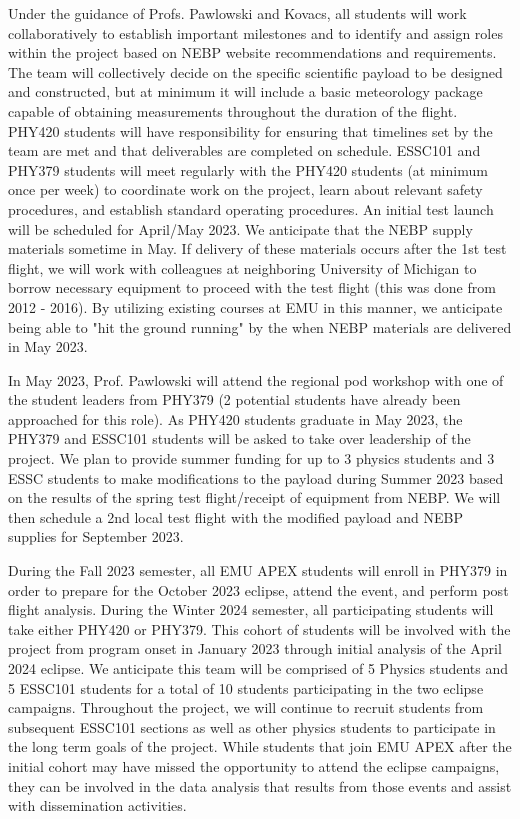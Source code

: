 \documentclass[12pt]{article}
\begin{document}
Under the guidance of Profs. Pawlowski and Kovacs, all students will work collaboratively to establish important milestones and to identify
and assign roles within the project based on NEBP website recommendations and requirements.
The team will collectively decide on the specific scientific payload to be designed and constructed,
but at minimum it will include a basic meteorology package capable of obtaining
measurements throughout the duration of the flight.
PHY420 students will have responsibility for ensuring that
timelines set by the team are met and that deliverables are completed on schedule.
ESSC101 and PHY379 students will
meet regularly with the PHY420 students (at minimum once per week) to coordinate work on the
project, learn about relevant safety procedures, and establish standard operating procedures.
An initial test launch will be scheduled for April/May 2023.
We anticipate that the NEBP supply materials sometime in May. If
delivery of these materials occurs after the 1st test flight, we will work with
colleagues at neighboring University of Michigan to borrow necessary equipment
to proceed with the test flight (this was done from 2012 - 2016). By utilizing existing courses
at EMU in this manner, we anticipate being able to "hit the ground running" by the
when NEBP materials are delivered in May 2023.

In May 2023, Prof. Pawlowski will attend the regional pod workshop with one of
the student leaders from PHY379 (2 potential students have already been approached
for this role).
As PHY420 students graduate in May 2023, the PHY379 and ESSC101 students will be
asked to take over leadership of the project. We plan to provide
summer funding for up to 3 physics students and 3 ESSC students to make modifications to the
payload during Summer 2023 based on the results of the spring test flight/receipt
of equipment from NEBP.
We will then schedule a 2nd local test flight with the modified payload and
NEBP supplies for September
2023.

 During the Fall 2023 semester, all EMU APEX students will enroll in PHY379 in order
 to prepare for the October 2023 eclipse, attend the event, and perform post flight
 analysis. During the Winter 2024 semester, all participating students will
 take either PHY420 or PHY379. This cohort of students
will be involved with the project from program onset in January 2023 through initial analysis
of the April 2024 eclipse. We anticipate this
team will be comprised of 5 Physics students and 5 ESSC101 students for a total
of 10 students participating in the two eclipse campaigns. Throughout the
project, we will continue to recruit students from subsequent ESSC101 sections as well as
other physics students to participate in the long term goals of the project. While students that
join EMU APEX after the initial cohort may have missed the opportunity to
attend the eclipse campaigns, they can be involved in the data analysis
that results from those events and assist with dissemination activities.
\end{document}
